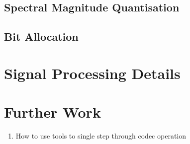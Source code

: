 \documentclass{article}
\begin{document}
\subsection{Spectral Magnitude Quantisation}

\subsection{Bit Allocation}

\section{Signal Processing Details}
\label{sect:details}

\section{Further Work}

\begin{enumerate}
\item How to use tools to single step through codec operation
\end{enumerate}
\cite{griffin1988multiband}



\end{document}
